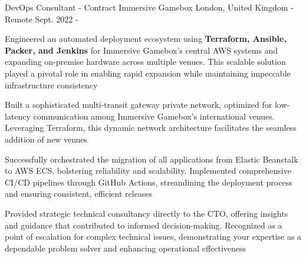 
\begin{cventries}


  \cventry
    {DevOps Consultant - Contract} %
    {Immersive Gamebox} %
    {London, United Kingdom - Remote} %
    {Sept. 2022 - } %
    {
      \begin{cvitems} %
        \item {Engineered an automated deployment ecosystem using \textbf{Terraform, Ansible, Packer, and Jenkins} for Immersive Gamebox's central AWS systems and expanding on-premise hardware across multiple venues. This scalable solution played a pivotal role in enabling rapid expansion while maintaining impeccable infrastructure consistency}
        \item {Built a sophisticated multi-transit gateway private network, optimized for low-latency communication among Immersive Gamebox's international venues. Leveraging Terraform, this dynamic network architecture facilitates the seamless addition of new venues}
        \item {Successfully orchestrated the migration of all applications from Elastic Beanstalk to AWS ECS, bolstering reliability and scalability. Implemented comprehensive CI/CD pipelines through GitHub Actions, streamlining the deployment process and ensuring consistent, efficient releases}
        \item {Provided strategic technical consultancy directly to the CTO, offering insights and guidance that contributed to informed decision-making. Recognized as a point of escalation for complex technical issues, demonstrating your expertise as a dependable problem solver and enhancing operational effectiveness}
      \end{cvitems}
    }


\end{cventries}
